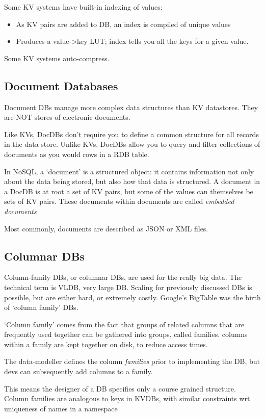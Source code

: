 \documentclass[11pt,a4paper,titlepage,dvipsnames,cmyk]{scrartcl}
\begin{document}
Some KV systems have built-in indexing of values:
\begin{itemize}
    \item As KV pairs are added to DB, an index is compiled of unique values
    \item Produces a value->key LUT; index tells you all the keys for a given value.
\end{itemize}

Some KV systems auto-compress.

\subsection{Document Databases}
Document DBs manage more complex data structures than KV datastores. They are NOT stores of electronic documents.

Like KVs, DocDBs don't require you to define a common structure for all records in the data store. Unlike KVs, DocDBs allow you to query and filter collections of documents as you would rows in a RDB table.

In NoSQL, a `document' is a structured object: it contains information not only about the data being stored, but also how that data is structured. A document in a DocDB is at root a set of KV pairs, but some of the values can themselves be sets of KV pairs. These documents within documents are called \textit{embedded documents}

Most commonly, documents are described as JSON or XML files.

\subsection{Columnar DBs}
Column-family DBs, or columnar DBs, are used for the really big data. The technical term is VLDB, very large DB. Scaling for previously discussed DBs is possible, but are either hard, or extremely costly. Google's BigTable was the birth of `column family' DBs.

`Column family' comes from the fact that groups of related columns that are frequently used together can be gathered into groups, called families. columns within a family are kept together on disk, to reduce access times.

The data-modeller defines the column \textit{families} prior to implementing the DB, but devs can subsequently add columns to a family.

This means the designer of a DB specifies only a course grained structure. Column families are analogous to keys in KVDBs, with similar constraints wrt uniqueness of names in a namespace
\end{document}
